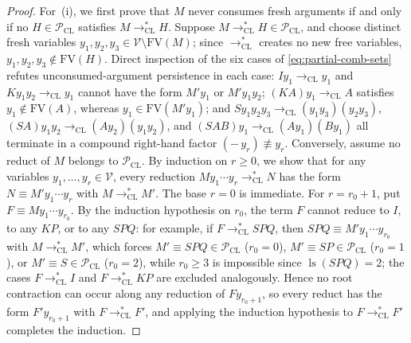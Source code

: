\documentclass[11pt,reqno]{amsart}
\numberwithin{equation}{section}
\theoremstyle{plain}
\theoremstyle{definition}
\theoremstyle{remark}
\DeclareMathOperator{\ls}{ls}
\begin{document}
\begin{proof}
For~(i), we first prove that $M$ never consumes fresh arguments if and only if no $H \in \mathcal{P}_{\mathrm{CL}}$ satisfies $M \to_{\mathrm{CL}}^* H$. Suppose $M \to_{\mathrm{CL}}^* H \in \mathcal{P}_{\mathrm{CL}}$, and choose distinct fresh variables $y_1, y_2, y_3 \in \mathcal{V} \setminus \mathrm{FV}(M)$; since $\to_{\mathrm{CL}}^*$ creates no new free variables, $y_1, y_2, y_3 \notin \mathrm{FV}(H)$. Direct inspection of the six cases of \eqref{eq:partial-comb-sets} refutes unconsumed-argument persistence in each case: $I y_1 \to_{\mathrm{CL}} y_1$ and $K y_1 y_2 \to_{\mathrm{CL}} y_1$ cannot have the form $M' y_1$ or $M' y_1 y_2$; $(K A) y_1 \to_{\mathrm{CL}} A$ satisfies $y_1 \notin \mathrm{FV}(A)$, whereas $y_1 \in \mathrm{FV}(M' y_1)$; and $S y_1 y_2 y_3 \to_{\mathrm{CL}} (y_1 y_3)(y_2 y_3)$, $(S A) y_1 y_2 \to_{\mathrm{CL}} (A y_2)(y_1 y_2)$, and $(S A B) y_1 \to_{\mathrm{CL}} (A y_1)(B y_1)$ all terminate in a compound right-hand factor $(-\,y_r) \not\equiv y_r$. Conversely, assume no reduct of $M$ belongs to $\mathcal{P}_{\mathrm{CL}}$. By induction on $r \ge 0$, we show that for any variables $y_1, \dots, y_r \in \mathcal{V}$, every reduction $M y_1 \cdots y_r \to_{\mathrm{CL}}^* N$ has the form $N \equiv M' y_1 \cdots y_r$ with $M \to_{\mathrm{CL}}^* M'$. The base $r = 0$ is immediate. For $r = r_0 + 1$, put $F \equiv M y_1 \cdots y_{r_0}$. By the induction hypothesis on $r_0$, the term $F$ cannot reduce to $I$, to any $K P$, or to any $S P Q$: for example, if $F \to_{\mathrm{CL}}^* S P Q$, then $S P Q \equiv M' y_1 \cdots y_{r_0}$ with $M \to_{\mathrm{CL}}^* M'$, which forces $M' \equiv S P Q \in \mathcal{P}_{\mathrm{CL}}$ ($r_0 = 0$), $M' \equiv S P \in \mathcal{P}_{\mathrm{CL}}$ ($r_0 = 1$), or $M' \equiv S \in \mathcal{P}_{\mathrm{CL}}$ ($r_0 = 2$), while $r_0 \ge 3$ is impossible since $\ls(S P Q) = 2$; the cases $F \to_{\mathrm{CL}}^* I$ and $F \to_{\mathrm{CL}}^* K P$ are excluded analogously. Hence no root contraction can occur along any reduction of $F y_{r_0+1}$, so every reduct has the form $F' y_{r_0+1}$ with $F \to_{\mathrm{CL}}^* F'$, and applying the induction hypothesis to $F \to_{\mathrm{CL}}^* F'$ completes the induction.


\end{proof}
\end{document}
